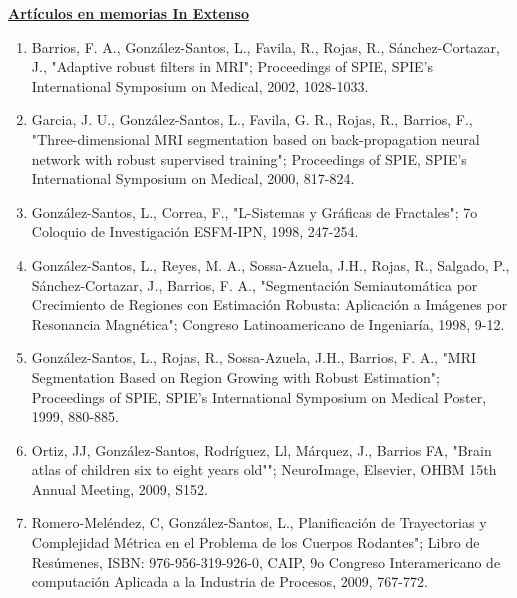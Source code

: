 {\large \textbf{\underline{Artículos en memorias In Extenso}}}

\begin{enumerate}
\item Barrios, F. A., González-Santos, L., Favila, R., Rojas, R., Sánchez-Cortazar, J.,
"Adaptive robust filters in MRI"; Proceedings of SPIE, SPIE's International Symposium on 
Medical, 2002, 1028-1033.

\item Garcia, J. U., González-Santos, L., Favila, G. R., Rojas, R., Barrios, F.,
"Three-dimensional MRI segmentation based on back-propagation neural network with robust supervised 
training"; Proceedings of SPIE, SPIE's International Symposium on Medical, 2000, 817-824.

\item González-Santos, L., Correa, F., "L-Sistemas y Gráficas de Fractales"; 7o Coloquio de 
Investigación ESFM-IPN, 1998, 247-254.

\item González-Santos, L., Reyes, M. A., Sossa-Azuela, J.H., Rojas, R., Salgado, P., 
Sánchez-Cortazar, J., Barrios, F. A., "Segmentación Semiautomática por Crecimiento de Regiones con 
Estimación Robusta: Aplicación a 
Imágenes por Resonancia Magnética"; Congreso Latinoamericano de Ingeniaría, 1998, 9-12.

\item González-Santos, L., Rojas, R., Sossa-Azuela, J.H., Barrios, F. A.,
"MRI Segmentation Based on Region Growing with Robust Estimation"; Proceedings of SPIE, SPIE's 
International Symposium on Medical Poster, 1999, 880-885.

\item Ortiz, JJ, González-Santos, Rodríguez, Ll, Márquez, J., Barrios FA,
"Brain atlas of children six to eight years old""; NeuroImage, Elsevier, OHBM 15th Annual Meeting, 
2009, S152.

\item Romero-Meléndez, C, González-Santos, L.,
Planificación de Trayectorias y Complejidad Métrica en el Problema de los Cuerpos Rodantes"; Libro 
de Resúmenes, ISBN: 976-956-319-926-0, CAIP, 9o Congreso Interamericano de computación Aplicada a la 
Industria de Procesos, 2009, 767-772.
\end{enumerate}

